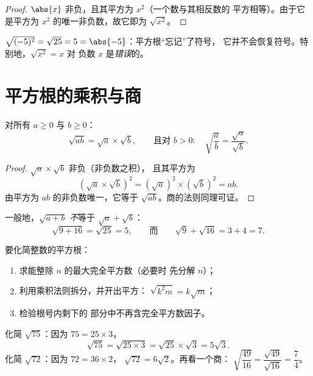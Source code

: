 \begin{proof}
$\abs{x}$ 非负，且其平方为 $x^2$（一个数与其相反数的
平方相等）。由于它是平方为
$x^2$ 的唯一非负数，故它即为 $\sqrt{x^2}$。
\end{proof}

\begin{example}
$\sqrt{(-5)^2} = \sqrt{25} = 5 = \abs{-5}$：平方根“忘记”了符号，
它并不会恢复符号。特别地，$\sqrt{x^2} = x$ 对
负数 $x$ 是\emph{错误}的。
\end{example}

\section{平方根的乘积与商}

\begin{theorem}[乘法与除法法则]\label{thm:g9:sqrt:rules}
对所有 $a \geq 0$ 与 $b \geq 0$：
\[
\sqrt{a b} = \sqrt a \times \sqrt b,
\qquad\text{且对 } b > 0:\quad
\sqrt{\frac ab} = \frac{\sqrt a}{\sqrt b} .
\]
\end{theorem}

\begin{proof}
$\sqrt a \times \sqrt b$ 非负（非负数之积），
且其平方为
\[
\left(\sqrt a \times \sqrt b\right)^2
= \left(\sqrt a\right)^2 \times \left(\sqrt b\right)^2
= a b .
\]
由平方为 $ab$ 的非负数唯一，它等于
$\sqrt{ab}$。商的法则同理可证。
\end{proof}

\begin{remark}[和的情形没有此法则！]
一般地，$\sqrt{a + b}$ \emph{不}等于 $\sqrt a + \sqrt b$：
\[
\sqrt{9 + 16} = \sqrt{25} = 5,
\qquad\text{而}\qquad
\sqrt 9 + \sqrt{16} = 3 + 4 = 7 .
\]
\end{remark}

\begin{method}[化简 $\sqrt n$]\label{met:g9:sqrt:simplify}
要化简整数的平方根：
\begin{enumerate}
  \item 求能整除 $n$ 的最大完全平方数（必要时
        先分解 $n$）；
  \item 利用乘积法则拆分，并开出平方：
        $\sqrt{k^2 m} = k\sqrt m$；
  \item 检验根号内剩下的
        部分中不再含完全平方数因子。
\end{enumerate}
\end{method}

\begin{example}\label{ex:g9:sqrt:simplify}
化简 $\sqrt{75}$：因为 $75 = 25 \times 3$，
\[
\sqrt{75} = \sqrt{25 \times 3} = \sqrt{25} \times \sqrt 3 = 5\sqrt3 .
\]
化简 $\sqrt{72}$：因为 $72 = 36 \times 2$，
$\sqrt{72} = 6\sqrt2$。再看一个商：
$\sqrt{\dfrac{49}{16}} = \dfrac{\sqrt{49}}{\sqrt{16}} = \dfrac74$。
\end{example}

